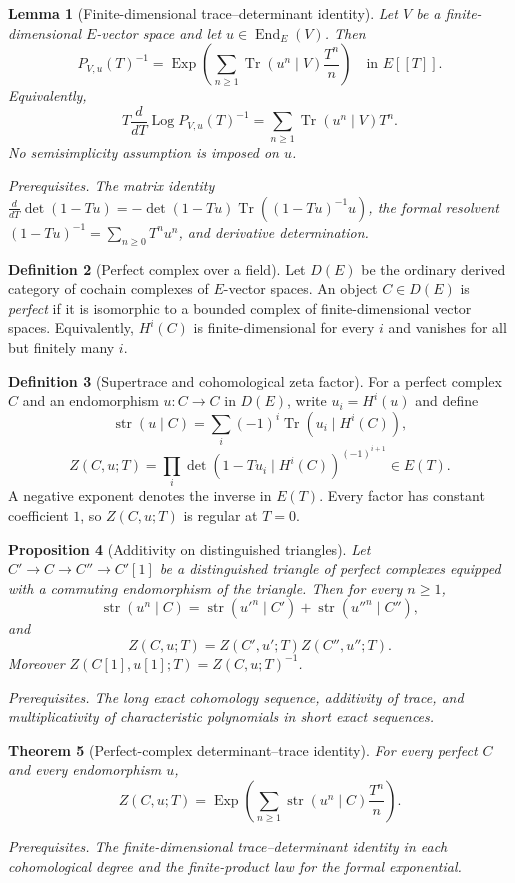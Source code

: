 \documentclass[10pt]{article}
\newtheorem{theorem}{Theorem}[section]
\newtheorem{proposition}[theorem]{Proposition}
\newtheorem{lemma}[theorem]{Lemma}
\theoremstyle{definition}
\newtheorem{definition}[theorem]{Definition}
\newcommand{\Tr}{\operatorname{Tr}}
\newcommand{\End}{\operatorname{End}}
\newcommand{\deps}[1]{\par\smallskip\noindent\textit{Prerequisites.} #1}
\begin{document}
\begin{lemma}[Finite-dimensional trace--determinant identity]
Let \(V\) be a finite-dimensional \(E\)-vector space and let
\(u\in\End_E(V)\).  Then
\[
 P_{V,u}(T)^{-1}
 =\operatorname{Exp}\left(
   \sum_{n\geq1}\Tr(u^n\mid V)\frac{T^n}{n}\right)
 \quad\text{in }E[[T]].
\]
Equivalently,
\[
 T\frac{d}{dT}\operatorname{Log}P_{V,u}(T)^{-1}
 =\sum_{n\geq1}\Tr(u^n\mid V)T^n.
\]
No semisimplicity assumption is imposed on \(u\).
\deps{The matrix identity
\(\frac{d}{dT}\det(1-Tu)=-\det(1-Tu)
\Tr((1-Tu)^{-1}u)\), the formal resolvent
\((1-Tu)^{-1}=\sum_{n\geq0}T^nu^n\), and derivative determination.}
\end{lemma}

\begin{definition}[Perfect complex over a field]
Let \(D(E)\) be the ordinary derived category of cochain complexes of
\(E\)-vector spaces.  An object \(C\in D(E)\) is \emph{perfect} if it is
isomorphic to a bounded complex of finite-dimensional vector spaces.
Equivalently, \(H^i(C)\) is finite-dimensional for every \(i\) and vanishes
for all but finitely many \(i\).
\end{definition}

\begin{definition}[Supertrace and cohomological zeta factor]
For a perfect complex \(C\) and an endomorphism \(u:C\to C\) in \(D(E)\),
write \(u_i=H^i(u)\) and define
\[
 \operatorname{str}(u\mid C)
 =\sum_i(-1)^i\Tr(u_i\mid H^i(C)),
\]
\[
 Z(C,u;T)
 =\prod_i\det(1-Tu_i\mid H^i(C))^{(-1)^{i+1}}
 \in E(T).
\]
A negative exponent denotes the inverse in \(E(T)\).  Every factor has
constant coefficient \(1\), so \(Z(C,u;T)\) is regular at \(T=0\).
\end{definition}

\begin{proposition}[Additivity on distinguished triangles]
Let \(C'\to C\to C''\to C'[1]\) be a distinguished triangle of perfect
complexes equipped with a commuting endomorphism of the triangle.  Then
for every \(n\geq1\),
\[
 \operatorname{str}(u^n\mid C)
 =\operatorname{str}(u'^n\mid C')+
  \operatorname{str}(u''^n\mid C''),
\]
and
\[
 Z(C,u;T)=Z(C',u';T)Z(C'',u'';T).
\]
Moreover \(Z(C[1],u[1];T)=Z(C,u;T)^{-1}\).
\deps{The long exact cohomology sequence, additivity of trace, and
multiplicativity of characteristic polynomials in short exact sequences.}
\end{proposition}

\begin{theorem}[Perfect-complex determinant--trace identity]
For every perfect \(C\) and every endomorphism \(u\),
\[
 \boxed{
 Z(C,u;T)=\operatorname{Exp}\left(
   \sum_{n\geq1}\operatorname{str}(u^n\mid C)\frac{T^n}{n}
 \right).}
\]
\deps{The finite-dimensional trace--determinant identity in each
cohomological degree and the finite-product law for the formal exponential.}
\end{theorem}
\end{document}
